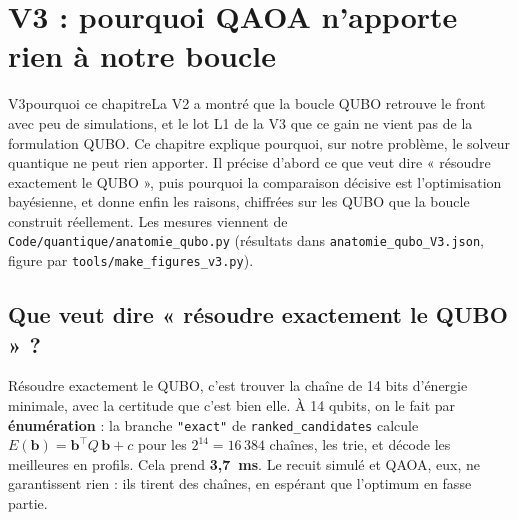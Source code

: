 \chapter{V3 : pourquoi QAOA n'apporte rien à notre boucle}\label{ch:pourquoi}

\begin{evolution}{V3}{pourquoi ce chapitre}La V2 a montré que la boucle QUBO retrouve le front avec peu de simulations, et le lot L1 de la V3 que ce gain ne vient pas de la formulation QUBO. Ce chapitre explique pourquoi, sur notre problème, le solveur quantique ne peut rien apporter. Il précise d'abord ce que veut dire « résoudre exactement le QUBO », puis pourquoi la comparaison décisive est l'optimisation bayésienne, et donne enfin les raisons, chiffrées sur les QUBO que la boucle construit réellement. Les mesures viennent de \texttt{Code/quantique/anatomie\_qubo.py} (résultats dans \texttt{anatomie\_qubo\_V3.json}, figure par \texttt{tools/make\_figures\_v3.py}).\end{evolution}

\section{Que veut dire « résoudre exactement le QUBO » ?}\label{sec:exact}
Résoudre exactement le QUBO, c'est trouver la chaîne de 14 bits d'énergie minimale, avec la certitude que c'est bien elle. À 14 qubits, on le fait par \textbf{énumération} : la branche \texttt{"exact"} de \texttt{ranked\_candidates} calcule $E(\mathbf b)=\mathbf b^\top Q\,\mathbf b+c$ pour les $2^{14}=16\,384$ chaînes, les trie, et décode les meilleures en profils. Cela prend \textbf{3,7~ms}. Le recuit simulé et QAOA, eux, ne garantissent rien : ils tirent des chaînes, en espérant que l'optimum en fasse partie.

